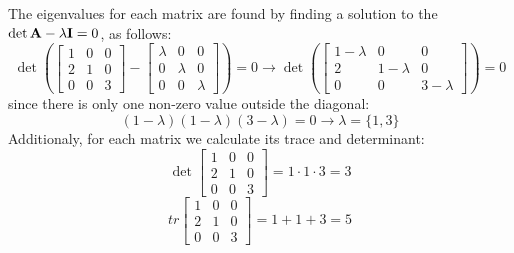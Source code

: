 The eigenvalues for each matrix are found by finding a solution to the
$\det{\mathbf{A} - \lambda\mathbf{I}} = 0$, as follows:
\begin{equation*}
    \det{\left(\begin{bmatrix}
        1 & 0 & 0 \\
        2 & 1 & 0 \\
        0 & 0 & 3 
    \end{bmatrix} - 
    \begin{bmatrix}
        \lambda & 0 & 0 \\
        0 & \lambda & 0 \\
        0 & 0 & \lambda 
    \end{bmatrix}\right)} = 0 \rightarrow
    \det{\left(\begin{bmatrix}
        1 - \lambda & 0 & 0 \\
        2 & 1 - \lambda & 0 \\
        0 & 0 & 3 - \lambda
    \end{bmatrix}\right)} = 0
\end{equation*}
since there is only one non-zero value outside the diagonal:
\begin{equation*}
    (1 - \lambda)(1 - \lambda)(3 - \lambda) = 0 \rightarrow
    \lambda = \{1, 3\}
\end{equation*}
Additionaly, for each matrix we calculate its trace and determinant:
\begin{equation*}
    \det{\begin{bmatrix}
        1 & 0 & 0 \\
        2 & 1 & 0 \\
        0 & 0 & 3 
    \end{bmatrix}} = 1 \cdot 1 \cdot 3 = 3
\end{equation*}
\begin{equation*}
    tr{\begin{bmatrix}
        1 & 0 & 0 \\
        2 & 1 & 0 \\
        0 & 0 & 3 
    \end{bmatrix}} = 1 + 1 + 3 = 5
\end{equation*}
